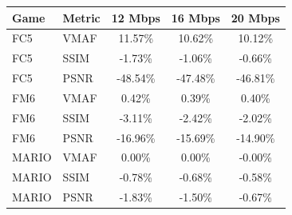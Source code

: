 \begin{tabular}{llccc}
\toprule
Game & Metric & 12 Mbps & 16 Mbps & 20 Mbps \\
\midrule
FC5 & VMAF & 11.57\% & 10.62\% & 10.12\% \\
FC5 & SSIM & -1.73\% & -1.06\% & -0.66\% \\
FC5 & PSNR & -48.54\% & -47.48\% & -46.81\% \\
\midrule
FM6 & VMAF & 0.42\% & 0.39\% & 0.40\% \\
FM6 & SSIM & -3.11\% & -2.42\% & -2.02\% \\
FM6 & PSNR & -16.96\% & -15.69\% & -14.90\% \\
\midrule
MARIO & VMAF & 0.00\% & 0.00\% & -0.00\% \\
MARIO & SSIM & -0.78\% & -0.68\% & -0.58\% \\
MARIO & PSNR & -1.83\% & -1.50\% & -0.67\% \\
\bottomrule
\end{tabular}
